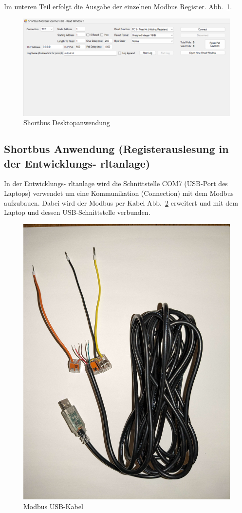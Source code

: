Im unteren Teil erfolgt die Ausgabe der einzelnen Modbus Register. Abb.~\ref{fig:Shortbusfenster}. 

\begin{figure}[H]
	\centering
	\includegraphics[width=1\linewidth]{Bilder/shortbus_fenster}
	\caption{Shortbus Desktopanwendung} 
	\label{fig:Shortbusfenster}
\end{figure}
  

\subsection{Shortbus Anwendung (Registerauslesung in der Entwicklungs- \ac{rltanlage})}

In der Entwicklungs- \ac{rltanlage} wird die Schnittstelle COM7 (USB-Port des Laptops) verwendet um eine Kommunikation (Connection) mit dem Modbus aufzubauen. Dabei wird der Modbus per Kabel  Abb.~\ref{fig:modbus_usbkabel} erweitert und mit dem Laptop und dessen USB-Schnittstelle verbunden.

\begin{figure}[H]
	\centering
	\includegraphics[width=0.5\linewidth]{Bilder/modbus_usbkabel}
	\caption{Modbus USB-Kabel} 
	\label{fig:modbus_usbkabel}
\end{figure}


